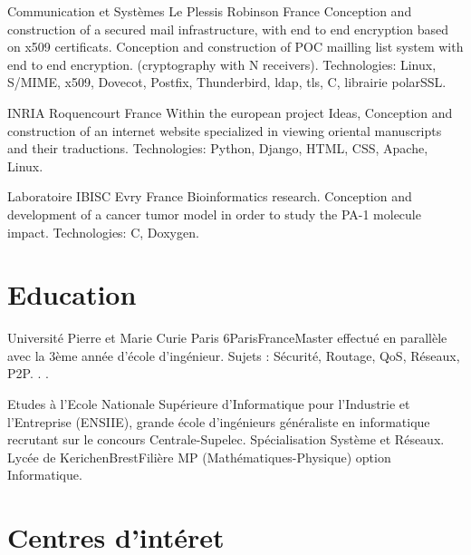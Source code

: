 \documentclass[10pt,a4paper]{moderncv}
\begin{document}
              {Communication et Systèmes}
              {Le Plessis Robinson}
              {France}
              {Conception and construction of a secured mail infrastructure, with end to end encryption
              based on x509 certificats. Conception and construction of POC mailling list system with end to end encryption. 
              (cryptography with N receivers).
              \newline Technologies: Linux, S/MIME, x509, Dovecot, Postfix, Thunderbird, ldap, tls, C, librairie polarSSL.
              }

              {INRIA}
              {Roquencourt}
              {France}
              {Within the european project Ideas, Conception and construction of an
               internet website specialized in viewing oriental manuscripts and their
               traductions.
                 \newline Technologies: Python, Django, HTML, CSS, Apache, Linux.
              }

              {Laboratoire IBISC}
              {Evry}
              {France}
              {Bioinformatics research. Conception
               and development of a cancer tumor model in order to
               study the PA-1 molecule impact.
                \newline Technologies: C, Doxygen.
              }

\section{Education}
{Université Pierre et Marie Curie Paris 6}{Paris}{France}{Master effectué en parallèle avec la 3ème année d’école d’ingénieur. Sujets : Sécurité, Routage,
QoS, Réseaux, P2P. . .}

{Etudes à l'Ecole Nationale Supérieure d'Informatique pour l'Industrie et l'Entreprise (ENSIIE), grande école d'ingénieurs
généraliste en informatique recrutant sur le concours Centrale-Supelec. Spécialisation Système et Réseaux.
}
{Lycée de Kerichen}{Brest}{}{Filière MP (Mathématiques-Physique) option Informatique.}

\section{Centres d'intéret}
\end{document}
